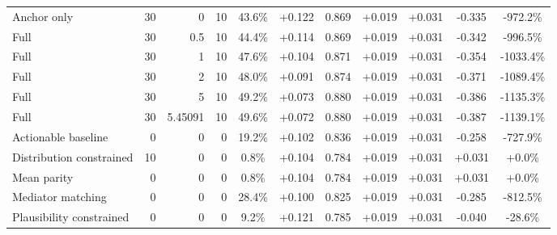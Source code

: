 \begin{table}[htbp]
\begin{tabular}{lrrrccccccc}
Anchor only & 30 & 0 & 10 & 43.6\% & +0.122 & 0.869 & +0.019 & +0.031 & -0.335 & -972.2\% \\
Full & 30 & 0.5 & 10 & 44.4\% & +0.114 & 0.869 & +0.019 & +0.031 & -0.342 & -996.5\% \\
Full & 30 & 1 & 10 & 47.6\% & +0.104 & 0.871 & +0.019 & +0.031 & -0.354 & -1033.4\% \\
Full & 30 & 2 & 10 & 48.0\% & +0.091 & 0.874 & +0.019 & +0.031 & -0.371 & -1089.4\% \\
Full & 30 & 5 & 10 & 49.2\% & +0.073 & 0.880 & +0.019 & +0.031 & -0.386 & -1135.3\% \\
Full & 30 & 5.45091 & 10 & 49.6\% & +0.072 & 0.880 & +0.019 & +0.031 & -0.387 & -1139.1\% \\
Actionable baseline & 0 & 0 & 0 & 19.2\% & +0.102 & 0.836 & +0.019 & +0.031 & -0.258 & -727.9\% \\
Distribution constrained & 10 & 0 & 0 & 0.8\% & +0.104 & 0.784 & +0.019 & +0.031 & +0.031 & +0.0\% \\
Mean parity & 0 & 0 & 0 & 0.8\% & +0.104 & 0.784 & +0.019 & +0.031 & +0.031 & +0.0\% \\
Mediator matching & 0 & 0 & 0 & 28.4\% & +0.100 & 0.825 & +0.019 & +0.031 & -0.285 & -812.5\% \\
Plausibility constrained & 0 & 0 & 0 & 9.2\% & +0.121 & 0.785 & +0.019 & +0.031 & -0.040 & -28.6\% \\
\bottomrule
\end{tabular}
\end{table}